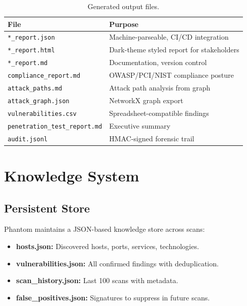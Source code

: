 \documentclass[12pt,a4paper]{report}
\begin{document}
\begin{table}[H]
\centering
\caption{Generated output files.}
\begin{tabularx}{\textwidth}{lX}
\toprule
\textbf{File} & \textbf{Purpose} \\
\midrule
\texttt{*\_report.json} & Machine-parseable, CI/CD integration \\
\texttt{*\_report.html} & Dark-theme styled report for stakeholders \\
\texttt{*\_report.md}   & Documentation, version control \\
\texttt{compliance\_report.md} & OWASP/PCI/NIST compliance posture \\
\texttt{attack\_paths.md} & Attack path analysis from graph \\
\texttt{attack\_graph.json} & NetworkX graph export \\
\texttt{vulnerabilities.csv} & Spreadsheet-compatible findings \\
\texttt{penetration\_test\_report.md} & Executive summary \\
\texttt{audit.jsonl} & HMAC-signed forensic trail \\
\bottomrule
\end{tabularx}
\end{table}


\chapter{Knowledge System}

\section{Persistent Store}

Phantom maintains a JSON-based knowledge store across scans:

\begin{itemize}
    \item \textbf{hosts.json:} Discovered hosts, ports, services, technologies.
    \item \textbf{vulnerabilities.json:} All confirmed findings with deduplication.
    \item \textbf{scan\_history.json:} Last 100 scans with metadata.
    \item \textbf{false\_positives.json:} Signatures to suppress in future scans.
\end{itemize}
\end{document}
